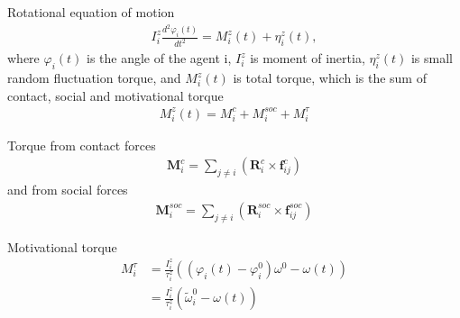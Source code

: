 
Rotational equation of motion 
\begin{align}
I_{i}^{z} \frac{d^{2} \varphi_{i}(t)}{d t^{2}} = M_{i}^{z}(t) + \eta_{i}^{z}(t),
\end{align}
where $ \varphi_{i}(t) $ is the angle of the agent i, $ I_{i}^{z} $ is moment of inertia, $ \eta_{i}^{z}(t) $ is small random fluctuation torque, and $ M_{i}^{z}(t) $ is total torque, which is the sum of contact, social and motivational torque
\begin{align}
M_{i}^{z}(t) = M_{i}^{c} + M_{i}^{soc} + M_{i}^{\tau}
\end{align}

Torque from contact forces
\begin{align}
\mathbf{M}_{i}^{c} = \sum_{j\neq i}^{} \left(\mathbf{R}_{i}^{c} \times \mathbf{f}_{ij}^{c}\right)
\end{align}
and from social forces
\begin{align}
\mathbf{M}_{i}^{soc} = \sum_{j\neq i}^{} \left(\mathbf{R}_{i}^{soc} \times \mathbf{f}_{ij}^{soc}\right)
\end{align}

Motivational torque
\begin{align}
M_{i}^{\tau} &= \frac{I_{i}^{z}}{\tau_{i}^{z}} \left((\varphi_{i}(t) - \varphi_{i}^{0}) \omega^{0} - \omega(t)\right) \\
&= \frac{I_{i}^{z}}{\tau_{i}^{z}} \left(\tilde{\omega}_{i}^{0} - \omega(t)\right)
\end{align}


